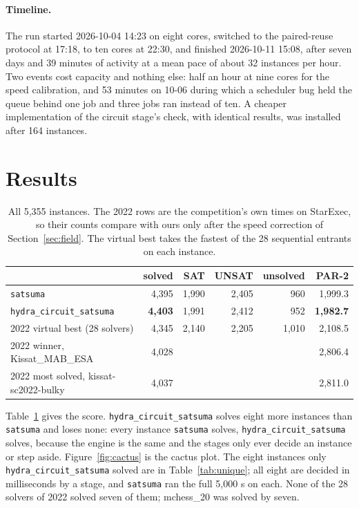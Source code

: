 \documentclass[10pt]{article}
\newcommand{\hcs}{\texttt{hydra\_circuit\_satsuma}}
\newcommand{\sats}{\texttt{satsuma}}
\newcommand{\partwo}{PAR-2}
\begin{document}
\paragraph{Timeline.} The run started 2026-10-04 14:23 on eight cores,
switched to the paired-reuse protocol at 17:18, to ten cores at 22:30, and
finished 2026-10-11 15:08, after seven days and 39 minutes of activity at a
mean pace of about 32 instances per hour. Two events cost capacity and
nothing else: half an hour at nine cores for the speed calibration, and 53 minutes on
10-06 during which a scheduler bug held the queue behind one job and three
jobs ran instead of ten. A cheaper implementation of the circuit stage's
check, with identical results, was installed after 164 instances.

\section{Results}

\begin{table}[h]
\centering
\begin{tabular}{lrrrrr}
\toprule
 & solved & SAT & UNSAT & unsolved & \partwo{} \\
\midrule
\sats{} & 4,395 & 1,990 & 2,405 & 960 & 1,999.3 \\
\hcs{} & \textbf{4,403} & 1,991 & 2,412 & 952 & \textbf{1,982.7} \\
\midrule
2022 virtual best (28 solvers) & 4,345 & 2,140 & 2,205 & 1,010 & 2,108.5 \\
2022 winner, Kissat\_MAB\_ESA & 4,028 & & & & 2,806.4 \\
2022 most solved, kissat-sc2022-bulky & 4,037 & & & & 2,811.0 \\
\bottomrule
\end{tabular}
\caption{All 5,355 instances. The 2022 rows are the competition's own
times on StarExec, so their counts compare with ours only after the
speed correction of Section~\ref{sec:field}. The virtual best takes the
fastest of the 28 sequential entrants on each instance.}
\label{tab:score}
\end{table}

Table~\ref{tab:score} gives the score. \hcs{} solves eight more instances
than \sats{} and loses none: every instance \sats{} solves, \hcs{} solves,
because the engine is the same and the stages only ever decide an instance
or step aside. Figure~\ref{fig:cactus} is the cactus plot. The eight
instances only \hcs{} solved are in Table~\ref{tab:unique}; all eight are
decided in milliseconds by a stage, and \sats{} ran the full 5,000 s on
each. None of the 28 solvers of 2022 solved seven of them; mchess\_20 was
solved by seven.
\end{document}

